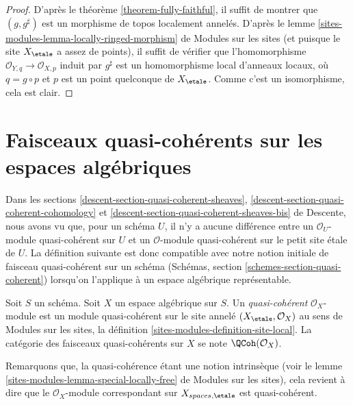 \begin{proof}
D'après le
théorème \ref{theorem-fully-faithful},
il suffit de montrer que $(g, g^\sharp)$ est un morphisme de
topos localement annelés. D'après le
lemme \ref{sites-modules-lemma-locally-ringed-morphism} de Modules sur les sites
(et puisque le site $X_\etale$ a assez de points),
il suffit de vérifier que l'homomorphisme
$\mathcal{O}_{Y, q} \to \mathcal{O}_{X, p}$ induit par $g^\sharp$
est un homomorphisme local d'anneaux locaux, où $q = g \circ p$ et $p$ est un point quelconque de
$X_\etale$. Comme c'est un isomorphisme, cela est clair.
\end{proof}














\section{Faisceaux quasi-cohérents sur les espaces algébriques}
\label{section-quasi-coherent}

\noindent
Dans les
sections \ref{descent-section-quasi-coherent-sheaves},
\ref{descent-section-quasi-coherent-cohomology} et
\ref{descent-section-quasi-coherent-sheaves-bis}
de Descente, nous avons vu que, pour un schéma $U$, il n'y a aucune différence entre un
$\mathcal{O}_U$-module quasi-cohérent sur $U$ et un
$\mathcal{O}$-module quasi-cohérent sur le petit site \'etale de $U$. La définition
suivante est donc compatible avec notre notion initiale de faisceau quasi-cohérent
sur un schéma
(Schémas, section \ref{schemes-section-quasi-coherent})
lorsqu'on l'applique à un espace algébrique représentable.

\begin{definition}
\label{definition-quasi-coherent}
Soit $S$ un schéma. Soit $X$ un espace algébrique sur $S$.
Un {\it quasi-cohérent} $\mathcal{O}_X$-module
est un module quasi-cohérent sur le site annelé
$(X_\etale, \mathcal{O}_X)$ au sens de
Modules sur les sites,
la définition \ref{sites-modules-definition-site-local}.
La catégorie des faisceaux quasi-cohérents sur $X$ se note
$\QCoh(\mathcal{O}_X)$.
\end{definition}

\noindent
Remarquons que, la quasi-cohérence étant une notion intrinsèque (voir le
lemme \ref{sites-modules-lemma-special-locally-free} de Modules sur les sites),
cela revient à dire que le $\mathcal{O}_X$-module correspondant
sur $X_{spaces, \etale}$ est quasi-cohérent.

